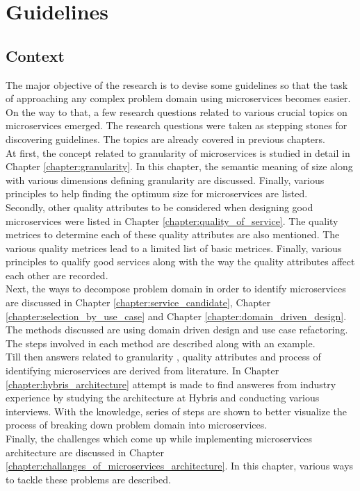 \chapter{Guidelines}\label{chapter:guidelines}
\section{Context}\label{section:guidelines/context}
The major objective of the research is to devise some guidelines so that the task of approaching any complex problem domain using microservices becomes easier. On the way to that, a few research questions related to various crucial topics on microservices emerged. The research questions were taken as stepping stones for discovering guidelines. The topics are already covered in previous chapters. 
\\
At first, the concept related to granularity of microservices is studied in detail in Chapter \ref{chapter:granularity}. In this chapter, the semantic meaning of size along with various dimensions defining granularity are discussed. Finally, various principles to help finding the optimum size for microservices are listed.
\\
Secondly, other quality attributes to be considered when designing good microservices were listed in Chapter \ref{chapter:quality_of_service}. The quality metrices to determine each of these quality attributes are also mentioned. The various quality metrices lead to a limited list of basic metrices. Finally, various principles to qualify good services along with the way the quality attributes affect each other are recorded.
\\
Next, the ways to decompose problem domain in order to identify microservices are discussed in Chapter \ref{chapter:service_candidate}, Chapter \ref{chapter:selection_by_use_case} and Chapter \ref{chapter:domain_driven_design}. The methods discussed are using domain driven design and use case refactoring. The steps involved in each method are described along with an example.
\\
Till then answers related to granularity , quality attributes and process of identifying microservices are derived from literature. In Chapter \ref{chapter:hybris_architecture} attempt is made to find answeres from industry experience by studying the architecture at Hybris and conducting various interviews. With the knowledge, series of steps are shown to better visualize the process of breaking down problem domain into microservices.
\\
Finally, the challenges which come up while implementing microservices architecture are discussed in Chapter \ref{chapter:challanges_of_microservices_architecture}. In this chapter, various ways to tackle these problems are described.

